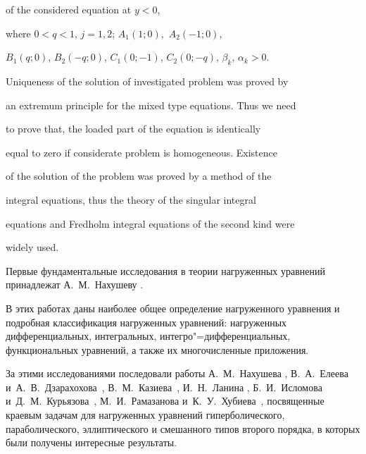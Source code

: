 {of the considered equation at $y < 0$, 

where $0 < q < 1$, $j = 1, 2$; $A_1 ( 1; 0),$ $A_2(  - 1; 0)$, 

$B_1(q; 0)$,  $B_2( - q; 0)$,  $C_1(0; - 1)$, $C_2(0; - q)$, $\beta _k$, $\alpha _k > 0$.



Uniqueness of the solution of investigated problem was proved by

an extremum principle for the mixed type equations. Thus we need

to prove that, the loaded part of the equation is identically

equal to zero if considerate problem is homogeneous. Existence

of the solution of the problem was proved by a method of the

integral equations, thus the theory of the singular integral

equations and Fredholm integral equations of the second kind were

widely used.}









\date{10/III/2016}











\makerutitle



Первые фундаментальные исследования в теории нагруженных уравнений принадлежат А.~М.~Нахушеву \cite{Naxush:bib:Naxushev, Nax:bib:Naxushe}. 

В этих работах даны наиболее общее определение нагруженного уравнения и подробная классификация нагруженных уравнений: нагруженных дифференциальных, интегральных, интегро"=дифференциальных, функциональных  уравнений, а также их многочисленные приложения. 

За этими исследованиями последовали работы А.~М.~Нахушева \cite{Naxusha:bib:Naxushevam},   В.~А.~Елеева и~А.~В.~Дзарахохова~\cite{Eleev:bib:Eleeva, Elev:bib:Eleevdzrox}, В.~М.~Казиева~\cite{Kaz:bib:Kaziyev, Kaze:bib:Kaziev}, И.~Н.~Ланина \cite{Lan:bib:Lanin}, Б.~И.~Исломова и~Д.~М.~Курьязова~\cite{Islom:bib:Islomov, Kur:bib:Kuryaz}, М.~И.~Рамазанова \cite{Ram:bib:Ramaz} и~К.~У.~Хубиева~\cite{Xub:bib:Xubiyev}, посвященные краевым задачам для нагруженных уравнений гиперболического, параболического, эллиптического и смешанного типов второго порядка, в которых были получены интересные результаты.


